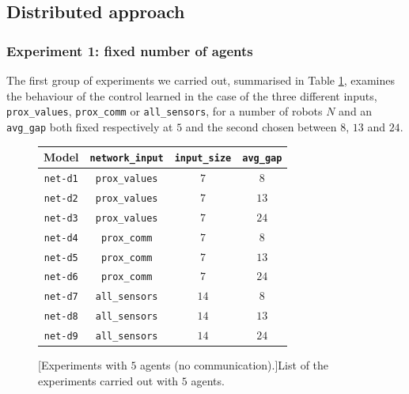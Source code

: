 \subsection{Distributed approach}
\label{subsec:task1-exp-distr}

\subsubsection{Experiment 1: fixed number of agents}
\label{subsubsec:task1-exp-distr-1}

The first group of experiments we carried out, summarised in Table 
\ref{tab:modeln5dist}, examines the behaviour of the control learned in the case 
of the three different inputs, \texttt{prox\_values}, \texttt{prox\_comm} or 
\texttt{all\_sensors}, for a number of robots $N$ and an \texttt{avg\_gap} both 
fixed respectively at $5$ and the second chosen between $8$, $13$ and $24$.
\begin{figure}[!htb]
	\centering
	\begin{tabular}{cccc}
		\toprule
		\textbf{Model} \quad & \textbf{\texttt{network\_input}} & 
		\textbf{\texttt{input\_size}} &
		\textbf{\texttt{avg\_gap}} \\
		\midrule
		\texttt{net-d1} 				 & \texttt{prox\_values}	&  $  7$  &  $  8$  \\
		\texttt{net-d2} 				& \texttt{prox\_values}	    &  $  7$  &  $13$ \\
		\texttt{net-d3} 				& \texttt{prox\_values}	    &  $  7$  &  $24$  \\
		\texttt{net-d4} 				 & \texttt{prox\_comm}	  &  $  7$  &  $  8$  \\
		\texttt{net-d5} 				 & \texttt{prox\_comm}	  &  $  7$  &  $13$  \\
		\texttt{net-d6} 				 & \texttt{prox\_comm}	  &  $  7$  &  $24$  \\
		\texttt{net-d7} 				 & \texttt{all\_sensors}	  &  $14$  &  $  8$  \\
		\texttt{net-d8} 				 & \texttt{all\_sensors}	  &  $14$  &  $13$ 	\\
		\texttt{net-d9} 				 & \texttt{all\_sensors}	  &  $14$  &  $24$ 	\\
		\bottomrule
	\end{tabular}
	[Experiments with $5$ agents (no communication).]{List of the 
	experiments carried out with $5$ agents.}
	\label{tab:modeln5dist}
\end{figure}


